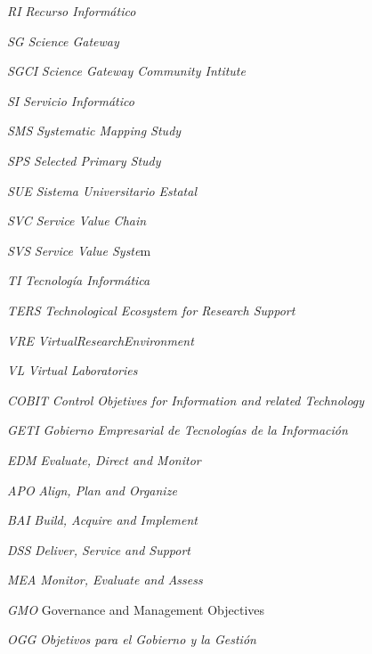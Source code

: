     {\textit{RI}}
    {\textit{Recurso Informático}}

    {\textit{SG}}
    {\textit{Science Gateway}}

    {\textit{SGCI}}
    {\textit{Science Gateway Community Intitute}}

    {\textit{SI}}
    {\textit{Servicio Informático}}

    {\textit{SMS}}
    {\textit{Systematic Mapping Study}}

    {\textit{SPS}}
    {\textit{Selected Primary Study}}

    {\textit{SUE}}
    {\textit{Sistema Universitario Estatal}}

    {\textit{SVC}}
    {\textit{Service Value Chain}}

    {\textit{SVS}}
    {\textit{Service Value Syste}m}

    {\textit{TI}}
    {\textit{Tecnología Informática}}

    {\textit{TERS}}
    {\textit{Technological Ecosystem for Research Support}}

    {\textit{VRE}}
    {\textit{\gls{VirtualResearchEnvironment}}}

    {\textit{VL}}
    {\textit{Virtual Laboratories}}



    {\textit{COBIT}}
    {\textit{Control Objetives for Information and related Technology}}

    {\textit{GETI}}
    {\textit{Gobierno Empresarial de Tecnologías de la Información}}

    {\textit{EDM}}
    {\textit{Evaluate, Direct and Monitor}} %

    {\textit{APO}}
    {\textit{Align, Plan and Organize}} %

    {\textit{BAI}}
    {\textit{Build, Acquire and Implement}} %

    {\textit{DSS}}
    {\textit{Deliver, Service and Support}} %

    {\textit{MEA}}
    {\textit{Monitor, Evaluate and Assess}} %

    {\textit{GMO}}
    {Governance and Management Objectives} %

    {\textit{OGG}}
    {\textit{Objetivos para el Gobierno y la Gestión}} %

